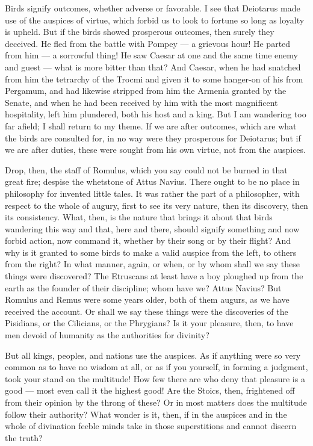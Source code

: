  Birds signify outcomes, whether adverse or favorable. I see that Deiotarus made use of the auspices of virtue, which forbid us to look to fortune so long as loyalty is upheld. But if the birds showed prosperous outcomes, then surely they deceived. He fled from the battle with Pompey — a grievous hour! He parted from him — a sorrowful thing! He saw Caesar at one and the same time enemy and guest — what is more bitter than that? And Caesar, when he had snatched from him the tetrarchy of the Trocmi and given it to some hanger-on of his from Pergamum, and had likewise stripped from him the Armenia granted by the Senate, and when he had been received by him with the most magnificent hospitality, left him plundered, both his host and a king. But I am wandering too far afield; I shall return to my theme. If we are after outcomes, which are what the birds are consulted for, in no way were they prosperous for Deiotarus; but if we are after duties, these were sought from his own virtue, not from the auspices.

 Drop, then, the staff of Romulus, which you say could not be burned in that great fire; despise the whetstone of Attus Navius. There ought to be no place in philosophy for invented little tales. It was rather the part of a philosopher, with respect to the whole of augury, first to see its very nature, then its discovery, then its consistency. What, then, is the nature that brings it about that birds wandering this way and that, here and there, should signify something and now forbid action, now command it, whether by their song or by their flight? And why is it granted to some birds to make a valid auspice from the left, to others from the right? In what manner, again, or when, or by whom shall we say these things were discovered? The Etruscans at least have a boy ploughed up from the earth as the founder of their discipline; whom have we? Attus Navius? But Romulus and Remus were some years older, both of them augurs, as we have received the account. Or shall we say these things were the discoveries of the Pisidians, or the Cilicians, or the Phrygians? Is it your pleasure, then, to have men devoid of humanity as the authorities for divinity?

 But all kings, peoples, and nations use the auspices. As if anything were so very common as to have no wisdom at all, or as if you yourself, in forming a judgment, took your stand on the multitude! How few there are who deny that pleasure is a good — most even call it the highest good! Are the Stoics, then, frightened off from their opinion by the throng of these? Or in most matters does the multitude follow their authority? What wonder is it, then, if in the auspices and in the whole of divination feeble minds take in those superstitions and cannot discern the truth?

